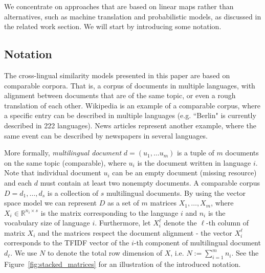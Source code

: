 \documentclass[twoside,11pt]{article}
\newcommand{\RR}{\mathbb{R}}
\begin{document}
We concentrate on approaches that are based on linear maps rather than alternatives, such as machine translation and probabilistic models, as discussed in the related work section.
We will start by introducing some notation.

\subsection{Notation}

The cross-lingual similarity models presented in this paper are based on comparable corpora. That is, a corpus of documents in multiple languages, with alignment between documents that are of the same topic, or even a rough translation of each other. Wikipedia is an example of a comparable corpus, where a specific entry can be described in multiple languages (e.g. ``Berlin" is currently described in 222 languages). News articles represent another example, where the same event can be described by newspapers in several languages.

More formally, \emph{multilingual document} $d = (u_1,\ldots u_m)$ is a tuple of $m$ documents on the same topic (comparable), where $u_i$ is the document written in language $i$. Note that individual document $u_i$ can be an empty document (missing resource) and each $d$ must contain at least two nonempty documents. A comparable corpus $D = {d_1, \ldots, d_s}$ is a collection of $s$ multilingual documents. By using the vector space model we can represent $D$ as a set of $m$ matrices $X_1,\ldots,X_m$, where $X_i \in \RR^{n_i \times s}$ is the matrix corresponding to the language $i$ and $n_i$ is the vocabulary size of language $i$. Furthermore, let $X_i^{\ell}$ denote the $\ell$-th column of matrix $X_i$ and the matrices respect the document alignment - the vector $X_i^\ell$ corresponds to the TFIDF vector of the $i$-th component of multilingual document $d_\ell$. We use $N$ to denote the total row dimension of $X$, i.e. $N:= \sum_{i=1}^m n_i$. See the Figure~\ref{fig:stacked_matrices} for an illustration of the introduced notation.
\end{document}

